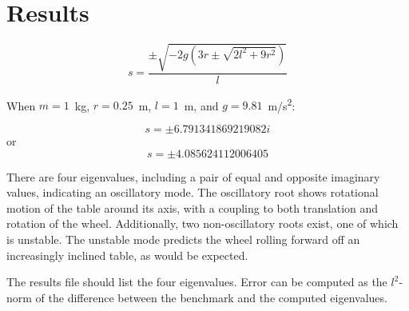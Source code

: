 \section*{Results}

\begin{equation}
 s=\frac{\pm\sqrt{-2g\left(3r\pm\sqrt{2l^2+9r^2}\right)}}{l}
\end{equation}

When $m=1$~\si{\kg}, $r=0.25$~\si{\m}, $l=1$~\si{\m}, and $g=9.81$~\si{m/s^2}:

\begin{equation}
s=\pm 6.791341869219082i 
\end{equation}
or
\begin{equation}
s=\pm 4.085624112006405
\end{equation}

There are four eigenvalues, including a pair of equal and opposite imaginary values, indicating an oscillatory mode.  The oscillatory root shows rotational motion of the table around its axis, with a coupling to both translation and rotation of the wheel.  Additionally, two non-oscillatory roots exist, one of which is unstable.  The unstable mode predicts the wheel rolling forward off an increasingly inclined table, as would be expected.

The results file should list the four eigenvalues.  Error can be computed as the $l^2$-norm of the difference between the benchmark and the computed eigenvalues.

